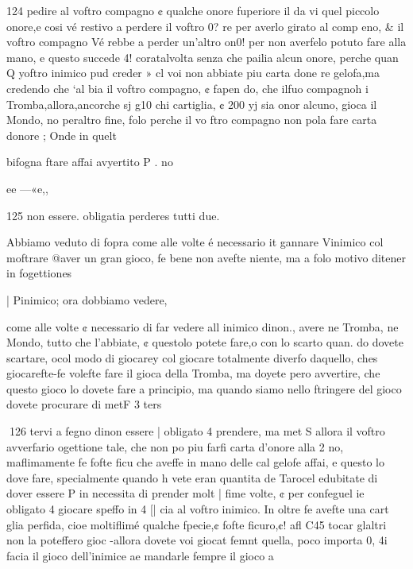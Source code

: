 \documentclass[11pt,a6paper]{article}
\begin{document}
 

 

 

 

 

 

 

 

 

 

 

124
pedire al voftro compagno ¢
qualche onore fuperiore il da
vi quel piccolo onore,e cosi vé
restivo a perdere il voftro 0?
re per averlo girato al comp
eno, & il voftro compagno Vé
rebbe a perder un’altro on0!
per non averfelo potuto fare
alla mano, e questo succede 4!
coratalvolta senza che pailia
alcun onore, perche quan Q
yoftro inimico pud creder » cl
voi non abbiate piu carta done
re gelofa,ma credendo che ‘al
bia il voftro compagno, ¢ fapen
do, che ilfuo compagnoh i
Tromba,allora,ancorche sj g10
chi cartiglia, ¢ 200 yj sia onor
alcuno, gioca il Mondo, no
peraltro fine, folo perche il vo
ftro compagno non pola fare
carta donore ; Onde in quelt

bifogna ftare affai avyertito P
. no

ee —«e,,
  

125
non essere. obligatia perderes
tutti due.

Abbiamo veduto di fopra come alle volte é necessario it
gannare Vinimico col moftrare
@aver un gran gioco, fe bene
non avefte niente, ma a folo
motivo ditener in fogettiones

| Pinimico; ora dobbiamo vedere,

come alle volte ¢ necessario di
far vedere all inimico dinon.,
avere ne Tromba, ne Mondo,
tutto che l’abbiate, ¢ questolo
potete fare,o con lo scarto quan.
do dovete scartare, ocol modo
di giocarey col giocare totalmente diverfo daquello, ches
giocarefte-fe volefte fare il gioca
della Tromba, ma doyete pero
avvertire, che questo gioco lo
dovete fare a principio, ma
quando siamo nello ftringere del
gioco dovete procurare di metF 3 ters

 

 

 
126
tervi a fegno dinon essere |
obligato 4 prendere, ma met
S allora il voftro avverfario
ogettione tale, che non po
piu farfi carta d’onore alla 2
no, maflimamente fe fofte ficu
che aveffe in mano delle cal
gelofe affai, e questo lo dove
fare, specialmente quando h
vete eran quantita de Tarocel
edubitate di dover essere P
in necessita di prender molt
|  fime volte, ¢ per confeguel
ie obligato 4 giocare speffo in 4
[| cia al voftro inimico.
In oltre fe avefte una cart
glia perfida, cioe moltiflimé
qualche fpecie,¢ fofte ficuro,¢!
afl C45 tocar
glaltri non la poteffero gioc
-allora dovete voi giocat femnt
quella, poco importa 0,
4i facia il gioco dell’inimice ae
mandarle fempre il gioco a
\end{document}
